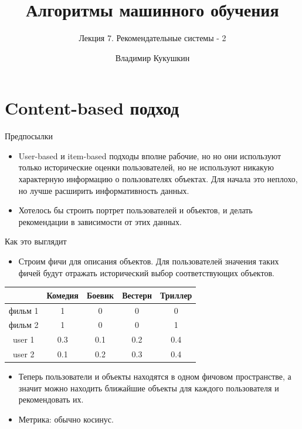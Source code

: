 \documentclass[9pt]{beamer}
\title{Алгоритмы машинного обучения}
\subtitle{Лекция 7. Рекомендательные системы - 2}
\author{Владимир Кукушкин}
\institute{СПбГЭУ - 30.12.2020}
\begin{document}
\titlepage


\section{Content-based подход}

\begin{frame}{Предпосылки}
\begin{itemize}
    \item User-based и item-based подходы вполне рабочие, но но они используют только исторические оценки пользователей, но не используют никакую характерную информацию о пользователях объектах. Для начала это неплохо, но лучше расширить информативность данных.
    \item Хотелось бы строить портрет пользователей и объектов, и делать рекомендации в зависимости от этих данных.
\end{itemize}
\end{frame}


\begin{frame}{Как это выглядит}
    \begin{itemize}
        \item Строим фичи для описания объектов. Для пользователей значения таких фичей будут отражать исторический выбор соответствующих объектов.
    \end{itemize}
    \begin{center}
        \begin{tabular}{c|c|c|c|c}
             & Комедия & Боевик & Вестерн & Триллер  \\ \hline
             фильм 1& 1 & 0 & 0 & 0 \\ \hline
             фильм 2& 1 & 0 & 0 & 1 \\\hline
             user 1& 0.3 & 0.1 & 0.2 & 0.4 \\\hline
             user 2& 0.1 & 0.2 & 0.3 & 0.4 \\
        \end{tabular}
    \end{center}
    \begin{itemize}
        \item Теперь пользователи и объекты находятся в одном фичовом пространстве, а значит можно находить ближайшие объекты для каждого пользователя и рекомендовать их.
        \item Метрика: обычно косинус.
    \end{itemize}
\end{frame}
\end{document}
